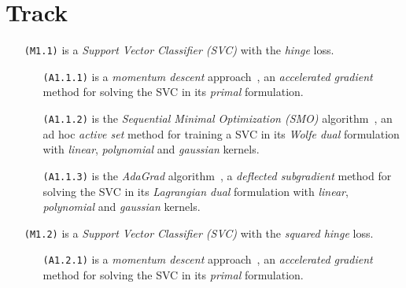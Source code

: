 \section{Track}

\begin{itemize}
\item[\texttt{(M1.1)}] is a \emph{Support Vector Classifier (SVC)} with the \emph{hinge} loss.

\begin{itemize}
\item[\texttt{(A1.1.1)}] is a \emph{momentum descent} approach~\cite{polyak1964some, nesterov1998introductory}, an \emph{accelerated gradient} method for solving the SVC in its \emph{primal} formulation.

\item[\texttt{(A1.1.2)}] is the \emph{Sequential Minimal Optimization (SMO)} algorithm~\cite{platt1998sequential, keerthi2001improvements}, an ad hoc \emph{active set} method for training a SVC in its \emph{Wolfe dual} formulation with \emph{linear}, \emph{polynomial} and \emph{gaussian} kernels.

\item[\texttt{(A1.1.3)}] is the \emph{AdaGrad} algorithm~\cite{duchi2011adaptive}, a \emph{deflected subgradient} method for solving the SVC in its \emph{Lagrangian dual} formulation with \emph{linear}, \emph{polynomial} and \emph{gaussian} kernels.
\end{itemize}

\end{itemize}

\begin{itemize}
\item[\texttt{(M1.2)}] is a \emph{Support Vector Classifier (SVC)} with the \emph{squared hinge} loss.

\begin{itemize}
\item[\texttt{(A1.2.1)}] is a \emph{momentum descent} approach~\cite{polyak1964some, nesterov1998introductory}, an \emph{accelerated gradient} method for solving the SVC in its \emph{primal} formulation.
\end{itemize}

\end{itemize}

\bigskip

